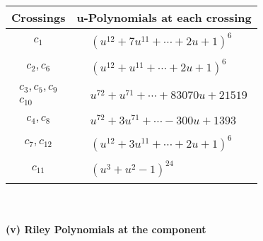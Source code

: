 \documentclass[1p]{elsarticle_modified}
\theoremstyle{definition}
\begin{document}
\begin{tabular}{m{50pt}|m{274pt}}
Crossings & \hspace{64pt}u-Polynomials at each crossing \\
\hline $$\begin{aligned}c_{1}\end{aligned}$$&$\begin{aligned}
&(u^{12}+7 u^{11}+\cdots+2 u+1)^{6}
\end{aligned}$\\
\hline $$\begin{aligned}c_{2},c_{6}\end{aligned}$$&$\begin{aligned}
&(u^{12}+u^{11}+\cdots+2 u+1)^{6}
\end{aligned}$\\
\hline $$\begin{aligned}c_{3},c_{5},c_{9}\\c_{10}\end{aligned}$$&$\begin{aligned}
&u^{72}+u^{71}+\cdots+83070 u+21519
\end{aligned}$\\
\hline $$\begin{aligned}c_{4},c_{8}\end{aligned}$$&$\begin{aligned}
&u^{72}+3 u^{71}+\cdots-300 u+1393
\end{aligned}$\\
\hline $$\begin{aligned}c_{7},c_{12}\end{aligned}$$&$\begin{aligned}
&(u^{12}+3 u^{11}+\cdots+2 u+1)^{6}
\end{aligned}$\\
\hline $$\begin{aligned}c_{11}\end{aligned}$$&$\begin{aligned}
&(u^3+u^2-1)^{24}
\end{aligned}$\\
\hline
\end{tabular}\\~\\
\newpage\renewcommand{\arraystretch}{1}
\flushleft \textbf{(v) Riley Polynomials at the component}\newline \\
\end{document}
